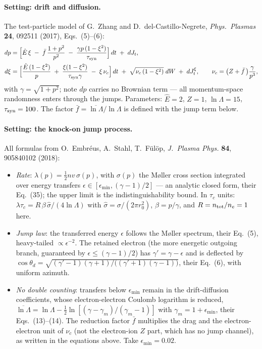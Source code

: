 \documentclass[11pt]{article}
\begin{document}
\paragraph{Setting: drift and diffusion.} The test-particle model of
G.~Zhang and D.~del-Castillo-Negrete, \emph{Phys.\ Plasmas} \textbf{24},
092511 (2017), Eqs.~(5)--(6):
\begin{align*}
dp &= \Bigl[\hat E\,\xi \;-\; \bar f\,\frac{1+p^2}{p^2} \;-\;
      \frac{\gamma p\,(1-\xi^2)}{\tau_{\rm syn}}\Bigr]\,dt \;+\; dJ_t,\\
d\xi &= \Bigl[\frac{\hat E\,(1-\xi^2)}{p} \;+\;
      \frac{\xi(1-\xi^2)}{\tau_{\rm syn}\gamma} \;-\; \xi\,\nu_c\Bigr]\,dt
      \;+\; \sqrt{\nu_c\,(1-\xi^2)}\;dW \;+\; dJ^\xi_t,
\qquad \nu_c=\bigl(Z+\bar f\,\bigr)\frac{\gamma}{p^3},
\end{align*}
with $\gamma=\sqrt{1+p^2}$; note $dp$ carries no Brownian term --- all
momentum-space randomness enters through the jumps. Parameters:
$\hat E=2$, $Z=1$, $\ln\Lambda=15$, $\tau_{\rm syn}=100$. The factor
$\bar f=\overline{\ln\Lambda}/\ln\Lambda$ is defined with the jump term
below.

\paragraph{Setting: the knock-on jump process.} All formulas from
O.~Embr\'eus, A.~Stahl, T.~F\"ul\"op, \emph{J.~Plasma Phys.} \textbf{84},
905840102 (2018):
\begin{itemize}[leftmargin=1.4em]
\item \emph{Rate}: $\lambda(p)=\tfrac12 nv\,\sigma(p)$, with $\sigma(p)$
  the M{\o}ller cross section integrated over energy transfers
  $\epsilon\in[\epsilon_{\min},(\gamma-1)/2]$ --- an analytic closed form,
  their Eq.~(35); the upper limit is the indistinguishability bound. In
  $\tau_c$ units: $\lambda\tau_c=R\,\beta\,\hat\sigma/(4\ln\Lambda)$ with
  $\hat\sigma=\sigma/(2\pi r_0^2)$, $\beta=p/\gamma$, and
  $R=n_{\rm tot}/n_e=1$ here.
\item \emph{Jump law}: the transferred energy $\epsilon$ follows the
  M{\o}ller spectrum, their Eq.~(5), heavy-tailed
  $\propto\epsilon^{-2}$. The retained electron (the more energetic
  outgoing branch, guaranteed by $\epsilon\le(\gamma-1)/2$) has
  $\gamma'=\gamma-\epsilon$ and is deflected by
  $\cos\theta_d=\sqrt{(\gamma'-1)(\gamma+1)/\bigl((\gamma'+1)(\gamma-1)\bigr)}$,
  their Eq.~(6), with uniform azimuth.
\item \emph{No double counting}: transfers below $\epsilon_{\min}$ remain
  in the drift-diffusion coefficients, whose electron-electron Coulomb
  logarithm is reduced,
  $\overline{\ln\Lambda}=\ln\Lambda-\tfrac12
  \ln[(\gamma-\gamma_m)/(\gamma_m-1)]$ with
  $\gamma_m=1+\epsilon_{\min}$, their Eqs.~(13)--(14). The reduction
  factor $\bar f$ multiplies the drag and the electron-electron unit of
  $\nu_c$ (not the electron-ion $Z$ part, which has no jump channel), as
  written in the equations above. Take $\epsilon_{\min}=0.02$.
\end{itemize}
\end{document}
